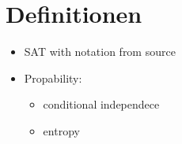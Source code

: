 \section{Definitionen}

\begin{itemize} 
\item SAT with notation from source
\item Propability:
	\begin{itemize}
		\item conditional independece
		\item entropy
	\end{itemize}
\end{itemize}